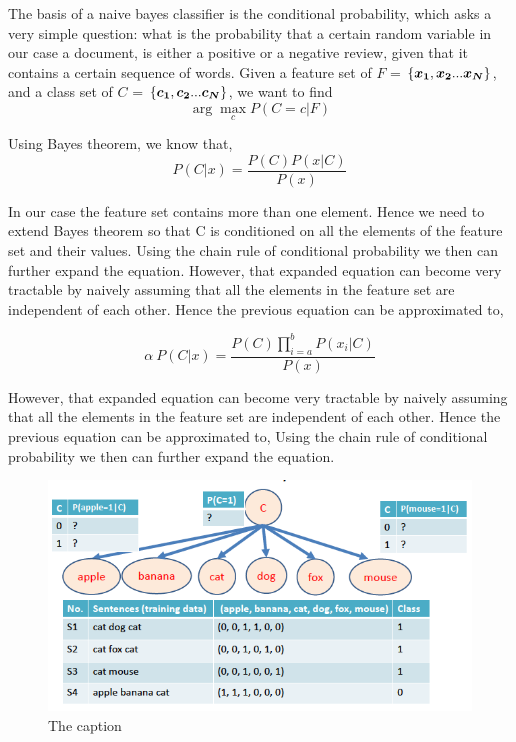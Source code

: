 \documentclass{article} %
\begin{document}
The basis of a naive bayes classifier is the conditional probability, which asks a very simple question: what is the probability that a certain random variable in our case a document, is either a positive or a negative review, given that it contains a certain sequence of words. Given a feature set of $F$ = $\mathcal \{\bm{x_1},\bm{x_2}...\bm{x_N}\}$, and a class set of $C$ = $\mathcal \{\bm{c_1},\bm{c_2}...\bm{c_N}\}$, we want to find 
\begin{equation*}
\arg\max_{c} P(C=c|F)
\end{equation*}

Using Bayes theorem, we know that, 
\begin{equation*}
P(C|x) = \frac {P(C)P(x|C)}{P(x)}
\end{equation*}

In our case the feature set contains more than one element. Hence we need to extend Bayes theorem so that C is conditioned on  all the elements of the feature set and their values. Using the chain rule of conditional probability we then can further expand the equation. However, that expanded equation can become very tractable by naively assuming that all the elements in the feature set are independent of each other. Hence the previous equation can be approximated to, 

\begin{equation*}
\alpha  \     P(C|x) = \frac {{P(C)}\prod_{i=a}^{b}P(x_i|C)}{P(x)}
\end{equation*}

However, that expanded equation can become very tractable by naively assuming that all the elements in the feature set are independent of each other. Hence the previous equation can be approximated to, Using the chain rule of conditional probability we then can further expand the equation. 

\begin{figure}[H]
  \centering
  \includegraphics[scale=0.4]{bernoulliNBexample3}
  \caption{The caption}   
  \label{fig:picture}
\end{figure}
\end{document}
